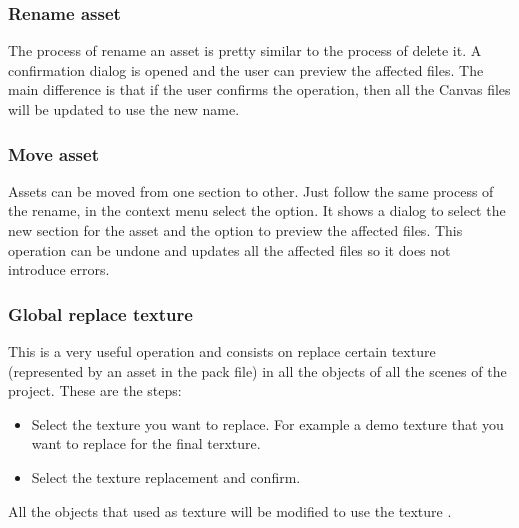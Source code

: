\documentclass[letterpaper,10pt,english]{sphinxmanual}
\begin{document}
\noindent{}


\subsubsection{Rename asset}
\label{\detokenize{assets_manager:rename-asset}}
The process of rename an asset is pretty similar to the process of delete it. A confirmation dialog is opened and the user can preview the affected files. The main difference is that if the user confirms the operation, then all the Canvas files will be updated to use the new name.


\subsubsection{Move asset}
\label{\detokenize{assets_manager:move-asset}}
Assets can be moved from one section to other. Just follow the same process of the rename, in the context menu select the  option. It shows a dialog to select the new section for the asset and the option to preview the affected files. This operation can be undone and updates all the affected files so it does not introduce errors.


\subsubsection{Global replace texture}
\label{\detokenize{assets_manager:global-replace-texture}}
This is a very useful operation and consists on replace certain texture (represented by an asset in the pack file) in all the objects of all the scenes of the project. These are the steps:
\begin{itemize}
\item {} 
Select the texture you want to replace. For example a demo texture that you want to replace for the final terxture.

\end{itemize}

\noindent{}
\begin{itemize}
\item {} 
Select the texture replacement and confirm.

\end{itemize}

\noindent{}

All the objects that used  as texture will be modified to use the texture .
\end{document}
